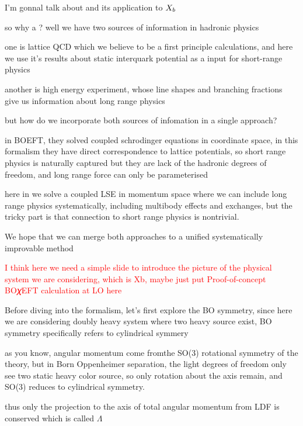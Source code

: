 \documentclass[11pt]{article}
\begin{document}
I'm gonnal talk about \BOchiEFT and its application to $X_b$


so why a \BOchiEFT? well we have two sources of information in hadronic physics

one is lattice QCD which we believe to be a first principle calculations, and here we use it's results about static interquark potential as a input for short-range physics

another is high energy experiment, whose line shapes and branching fractions give us information about long range physics

but how do we incorporate both sources of infomation in a single approach?

in BOEFT, they solved coupled schrodinger equations in coordinate space, in this formalism they have direct correspondence to lattice potentials, so short range physics is naturally captured
but they are lack of the hadronic degrees of freedom, and long range force can only be parameterised

here in \BOchiEFT we solve a coupled LSE in momentum space
where we can include long range physics systematically, including multibody effects and exchanges, but the tricky part is that connection to short range physics is nontrivial.

We hope that we can merge both approaches to a unified systematically improvable method

\textcolor{red}{I think here we need a simple slide to introduce the picture of the physical system we are considering, which is Xb, maybe just put Proof-of-concept BO𝜒EFT calculation at LO here}

Before diving into the formalism, let's first explore the BO symmetry, since here we are considering doubly heavy system where two heavy source exist, BO symmetry specifically refers to cylindrical symmery

as you know, angular momentum come fromthe SO(3) rotational symmetry of the theory, but in Born Oppenheimer separation, the light degrees of freedom only see two static heavy color source, so only rotation about the axis remain, and SO(3) reduces to cylindrical symmetry.

thus only the projection to the axis of total angular momentum from LDF is conserved which is called $\Lambda$
\end{document}
